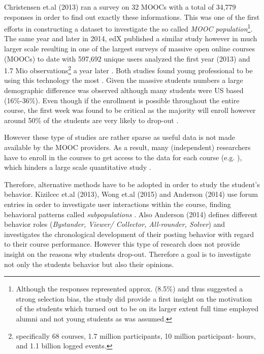 \documentclass[
	a4paper,
	pdftex,
	12pt,	
	footinclude=true,
	fleqn,
	final,
	]{report}%
\begin{document}
Christensen et.al (2013) ran a survey on 32 MOOCs with a total of 34,779 responses in order to 
find out exactly these informations. This was one of the first efforts in constructing a dataset to 
investigate the so called \emph{MOOC population}\footnote{ 
Although the responses represented approx. (8.5\%) and thus suggested a strong 
selection bias, the study did provide a first insight on the motivation of the students which turned out to 
be on its larger extent full time employed alumni and not young students as was assumed.
}. The same year and later in 2014, edX published a similar study however in much larger scale \cite{Ho2013,Ho2015a}
resulting in one of the largest surveys of massive open online courses (MOOCs) to date \cite{Ho2015a} with 
597,692 unique users analyzed the first year (2013) and 1.7 Mio observations\footnote{specifically 68 courses, 1.7 million participants, 10 million 
participant- hours, and 1.1 billion logged events.} a year later \cite{Ho2015a}. 
Both studies found young professional to be using this technology 
the most \cite{Christensen2013,Ho2013}. Given the massive students numbers
a large demographic difference was observed\cite{Ho2015a} although
many students were US based (16\%-36\%). 
Even though if the enrollment is possible throughout the entire course,
the first week was found to be critical as the majority will enroll however
around 50\% of the students are very likely to drop-out \cite{Ho2013}.

However these type of studies are rather sparse as useful data is not made available
by the MOOC providers. As a result, many (independent) researchers have 
to enroll in the courses to get access to the data for each course (e.g. \cite{Adamopoulos2013}), 
which hinders a large scale quantitative study \cite{Taylor2012}. 

Therefore, alternative methods have to be adopted in order to study the student's behavior. 
Kizilcec et.al (2013), Wong et.al (2015) and Anderson (2014) use forum entries in order 
to investigate user interactions within the course, finding behavioral patterns called
\emph{subpopulations} \cite{Kizilcec2013}. Also Anderson (2014) defines different 
behavior roles (\emph{Bystander, Viewer/ Collector, All-rounder, Solver}) 
and investigates the chronological development of their posting behavior 
with regard to their course performance. However this type of research does not provide 
insight on the reasons why students drop-out. Therefore a goal is to investigate 
not only the students behavior but also their opinions.
\end{document}
